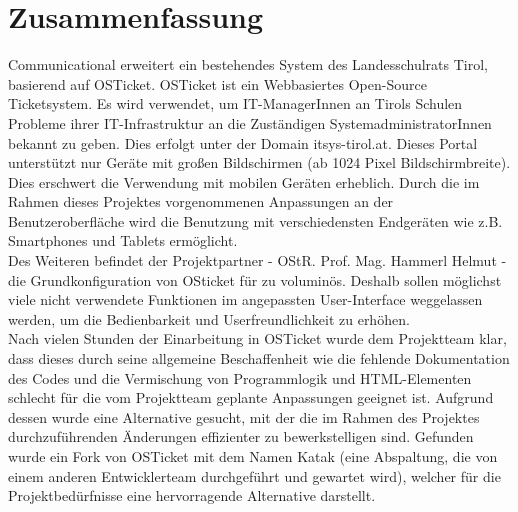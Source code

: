\chapter*{Zusammenfassung}
Communicational erweitert ein bestehendes System des Landesschulrats Tirol, basierend auf OSTicket. OSTicket ist ein Webbasiertes Open-Source Ticketsystem. Es wird verwendet, um IT-ManagerInnen an Tirols Schulen Probleme ihrer IT-Infrastruktur an die Zuständigen SystemadministratorInnen bekannt zu geben. Dies erfolgt unter der Domain itsys-tirol.at. Dieses Portal unterstützt nur Geräte mit großen Bildschirmen (ab 1024 Pixel Bildschirmbreite). Dies erschwert die Verwendung mit mobilen Geräten erheblich. Durch die im Rahmen dieses Projektes vorgenommenen Anpassungen an der Benutzeroberfläche wird die Benutzung mit verschiedensten Endgeräten wie z.B. Smartphones und Tablets ermöglicht.\\
Des Weiteren befindet der Projektpartner - OStR. Prof. Mag. Hammerl Helmut - die Grundkonfiguration von OSticket für zu voluminös. Deshalb sollen möglichst viele nicht verwendete Funktionen im angepassten User-Interface weggelassen werden, um die Bedienbarkeit und Userfreundlichkeit zu erhöhen.\\
Nach vielen Stunden der Einarbeitung in OSTicket wurde dem Projektteam klar, dass dieses durch seine allgemeine Beschaffenheit wie die fehlende Dokumentation des Codes und die Vermischung von Programmlogik und HTML-Elementen schlecht für die vom Projektteam geplante Anpassungen geeignet ist. Aufgrund dessen wurde eine Alternative gesucht, mit der die im Rahmen des Projektes durchzuführenden Änderungen effizienter zu bewerkstelligen sind. Gefunden wurde ein Fork von OSTicket mit dem Namen Katak (eine Abspaltung, die von einem anderen Entwicklerteam durchgeführt und gewartet wird), welcher für die Projektbedürfnisse eine hervorragende Alternative darstellt.


